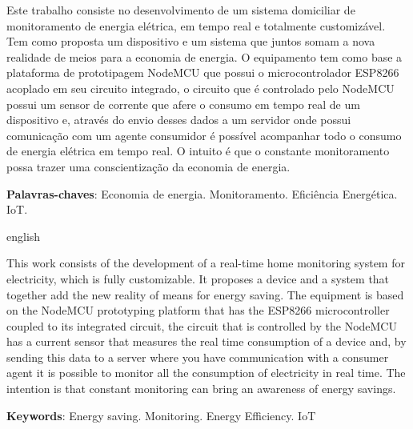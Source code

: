 \setlength{\absparsep}{18pt} %
\begin{resumo}

Este trabalho consiste no desenvolvimento de um sistema domiciliar de monitoramento de energia elétrica, em tempo real e totalmente customizável.
Tem como proposta um dispositivo e um sistema que juntos somam a nova realidade de meios para a economia de energia.
O equipamento tem como base a plataforma de prototipagem NodeMCU que possui o microcontrolador ESP8266 acoplado em seu circuito integrado,
o circuito que é controlado pelo NodeMCU possui um sensor de corrente que afere o consumo em tempo real de um dispositivo e, através
do envio desses dados a um servidor onde possui comunicação com um agente consumidor é possível acompanhar todo o consumo de energia elétrica em tempo real.
O intuito é que o constante monitoramento possa trazer uma conscientização da economia de energia.
 
 \noindent
 \textbf{Palavras-chaves}: Economia de energia. Monitoramento. Eficiência Energética. IoT. 
\end{resumo}
\begin{resumo}[Abstract]
	\begin{otherlanguage*}{english}	
	
	This work consists of the development of a real-time home monitoring system for electricity, which is fully customizable. It proposes a device and a system that together add the new reality of means for energy saving. The equipment is based on the NodeMCU prototyping platform that has the ESP8266 microcontroller coupled to its integrated circuit, the circuit that is controlled by the NodeMCU has a current sensor that measures the real time consumption of a device and, by sending this data to a server where you have communication with a consumer agent it is possible to monitor all the consumption of electricity in real time. The intention is that constant monitoring can bring an awareness of energy savings.
	
	\vspace{\onelineskip}
	\noindent 
	\textbf{Keywords}: Energy saving. Monitoring. Energy Efficiency. IoT
	\end{otherlanguage*}
\end{resumo}